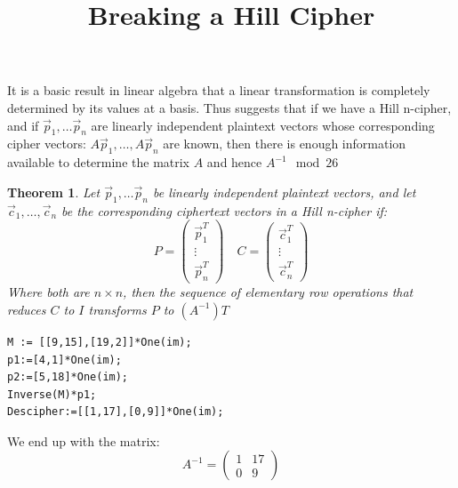 \documentclass{beamer}
\newtheorem{thm}{Theorem}
\theoremstyle{definition}
\theoremstyle{remark}
\begin{document}
\LogoOff
\begin{frame}
	\title{Breaking a Hill Cipher}
	It is a basic result in linear algebra that a linear transformation is completely determined by its values at a basis. Thus suggests that if we have a Hill n-cipher, and if $ \vec{p}_1,\ldots \vec{p}_n $ are linearly independent plaintext vectors whose corresponding cipher vectors: $ A\vec{p}_1, \ldots, A \vec{p}_n $ are known, then there is enough information available to determine the matrix $ A $ and hence $ A^{-1} \mod 26 $
	\begin{thm}
		Let $ \vec{p}_1,\ldots \vec{p}_n $ be linearly independent plaintext vectors, and let $ \vec{c}_1,\ldots, \vec{c}_n $ be the corresponding ciphertext vectors in a Hill n-cipher if:
		\[ P = \begin{pmatrix}
		\vec{p}_1^T \\
		\vdots \\
		\vec{p}_n^T
		\end{pmatrix} \quad C =
		\begin{pmatrix}
		\vec{c}_1^T \\
		\vdots \\
		\vec{c}_n^T
		\end{pmatrix} \]
		Where both are $ n \times n $, then the sequence of elementary row operations that reduces $ C $  to $ I $ transforms $ P $ to $ (A^{-1})T $
	\end{thm}
	
\end{frame}

\begin{frame}[fragile]
\begin{verbatim}
M := [[9,15],[19,2]]*One(im);
p1:=[4,1]*One(im);
p2:=[5,18]*One(im);
Inverse(M)*p1;
Descipher:=[[1,17],[0,9]]*One(im);
\end{verbatim}
We end up with the matrix:
\[ A^{-1} = \begin{pmatrix}
1 & 17 \\
0 & 9
\end{pmatrix} \]
\end{frame}
\end{document}
